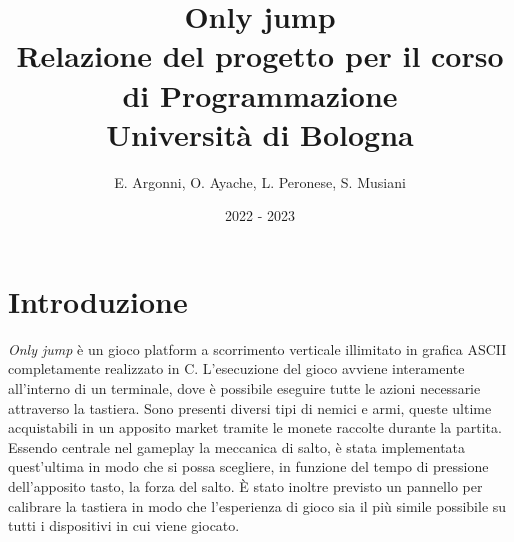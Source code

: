 \documentclass[a4paper]{article}
\title{\textbf{Only jump}\\
\vspace{0.2cm}\normalsize Relazione del progetto per il corso di Programmazione\\
\normalsize Università di Bologna
}
\author{
  E. Argonni,
  O. Ayache,
  L. Peronese,
  S. Musiani
}
\date{2022 - 2023}
\def\CC{{C\nolinebreak[4]\hspace{-.05em}\raisebox{.4ex}{\tiny\bf ++}}}
\begin{document}
\maketitle

\section{Introduzione}
\emph{Only jump} è un gioco platform a scorrimento verticale illimitato 
in grafica ASCII completamente realizzato in \CC. L'esecuzione del gioco 
avviene interamente all'interno di un terminale, dove è possibile eseguire tutte
le azioni necessarie attraverso la tastiera. Sono presenti diversi tipi di 
nemici e armi, queste ultime acquistabili in un apposito market tramite le 
monete raccolte durante la partita. Essendo centrale nel gameplay la meccanica 
di salto, è stata implementata quest'ultima in modo che si possa scegliere, in 
funzione del tempo di pressione dell'apposito tasto, la forza del salto. È stato
inoltre previsto un pannello per calibrare la tastiera in modo che l'esperienza
di gioco sia il più simile possibile su tutti i dispositivi in cui viene 
giocato.
\end{document}
